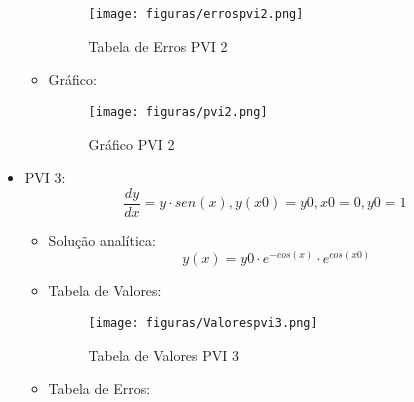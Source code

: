 \documentclass[
	12pt,				%
    oneside,			%
	a4paper,			%
	english,			%
	french,				%
	spanish,			%
	brazil,				%
	]{abntex2}
\begin{document}
\begin{itemize}
\begin{itemize}
\begin{figure}[!htb]
     \centering
     \texttt{[image: figuras/errospvi2.png]}
     \caption{Tabela de Erros PVI 2}
     \label{Tabela de Erros PVI 2}
\end{figure}
\newpage
\item Gráfico:
	\begin{figure}[!htb]
     \centering
     \texttt{[image: figuras/pvi2.png]}
     \caption{Gráfico PVI 2}
     \label{Gráfico PVI 2}
\end{figure}
\end{itemize}

\newpage

\item PVI 3: \begin{equation} {\frac{dy}{dx} = y \cdot sen(x) , y(x0) = y0}, x0 = 0, y0 = 1 \end{equation}
	\begin{itemize}
	\item Solução analítica: \begin{equation} y(x) = y0 \cdot e^{-cos(x)} \cdot e^{cos(x0)} \end{equation}
	\item Tabela de Valores:
	\begin{figure}[!htb]
     \centering
     \texttt{[image: figuras/Valorespvi3.png]}
     \caption{Tabela de Valores PVI 3}
     \label{Tabela de Valores PVI 3}
\end{figure}
	\item Tabela de Erros:
	\begin{figure}[!htb]


\end{figure}
\end{itemize}
\end{itemize}
\end{document}
